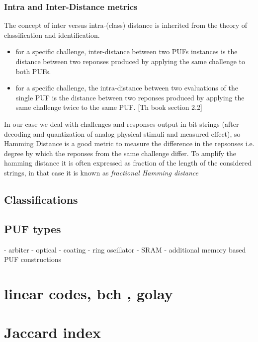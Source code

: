 \subsubsection{Intra and Inter-Distance metrics}
The concept of inter versus intra-(class) distance is inherited from the theory of classification and identification.
\begin{itemize}
	\item for a specific challenge, inter-distance between two PUFs instances is the distance between two reponses produced by applying the same challenge to both PUFs.
	\item for a specific challenge, the intra-distance between two evaluations of the single PUF is the distance between two reponses produced by applying the same challenge twice to the same PUF. [Th book section 2.2]
\end{itemize} 

In our case we deal with challenges and responses output in bit strings (after decoding and quantization of analog physical stimuli and measured effect), so Hamming Distance is a good metric to measure the difference in the repsonses i.e. degree by which the reponses from the same challenge differ. To amplify the hamming distance it is often expressed as fraction of the length of the considered strings, in that case it is known as \emph{fractional Hamming distance} 

\subsection{Classifications}
\subsection{PUF types}
	- arbiter
	- optical
	- coating
	- ring oscillator
	- SRAM
	- additional memory based PUF constructions

\section{linear codes, bch , golay}

\section{Jaccard index}

